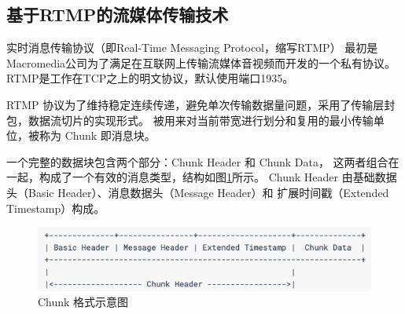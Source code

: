 
\newpage
\subsection{基于RTMP的流媒体传输技术}



实时消息传输协议（即Real-Time Messaging Protocol，缩写RTMP） 最初是Macromedia公司为了满足在互联网上传输流媒体音视频而开发的一个私有协议。
RTMP是工作在TCP之上的明文协议，默认使用端口1935。

RTMP 协议为了维持稳定连续传递，避免单次传输数据量问题，采用了传输层封包，数据流切片的实现形式。
被用来对当前带宽进行划分和复用的最小传输单位，被称为 Chunk 即消息块。

一个完整的数据块包含两个部分：Chunk Header 和 Chunk Data，
这两者组合在一起，构成了一个有效的消息类型，结构如图\ref{Fig:chunk}所示。
Chunk Header 由基础数据头（Basic Header）、消息数据头（Message Header）和
扩展时间戳（Extended Timestamp）构成。

\begin{figure}[ht]
    \centering
    \includegraphics[scale=.6]{./Figure/IMG_chunk.png}
    \caption{Chunk 格式示意图}
    \label{Fig:chunk}
\end{figure}

